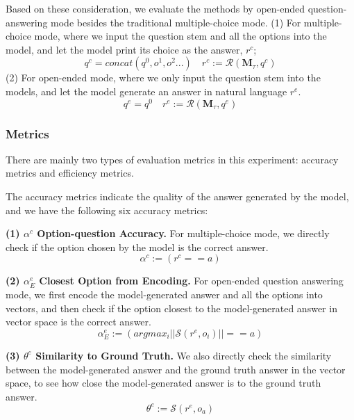 Based on these consideration, we evaluate the methods by open-ended question-answering mode besides the traditional multiple-choice mode. (1) For multiple-choice mode, where we input the question stem and all the options into the model, and let the model print its choice as the answer, $r^c$;
\begin{equation}
    q^c = concat(q^0, o^1, o^2...) \quad r^c := \mathcal{R}(\mathbf{M}_\tau, q^c)
\end{equation}
(2) For open-ended mode, where we only input the question stem into the models, and let the model generate an answer in natural language $r^e$.
\begin{equation}
    q^e = q^0 \quad r^e := \mathcal{R}(\mathbf{M}_\tau, q^e)
\end{equation}

\subsubsection{Metrics}

There are mainly two types of evaluation metrics in this experiment: accuracy metrics and efficiency metrics.

The accuracy metrics indicate the quality of the answer generated by the model, and we have the following six accuracy metrics:

\textbf{(1) $\alpha^c$ Option-question Accuracy.} For multiple-choice mode, we directly check if the option chosen by the model is the correct answer.
\begin{equation}
    \alpha^c := (r^c == a)
\end{equation}

\textbf{(2) $\alpha^e_E$ Closest Option from Encoding.} For open-ended question answering mode, we first encode the model-generated answer and all the options into vectors, and then check if the option closest to the model-generated answer in vector space is the correct answer.
\begin{equation}
    \alpha^e_E := (argmax_i ||\mathcal{S}(r^e, o_i)|| == a)
\end{equation}

\textbf{(3) $\theta^e$ Similarity to Ground Truth.} We also directly check the similarity between the model-generated answer and the ground truth answer in the vector space, to see how close the model-generated answer is to the ground truth answer.
\begin{equation}
    \theta^e := \mathcal{S}(r^e, o_a)
\end{equation}

